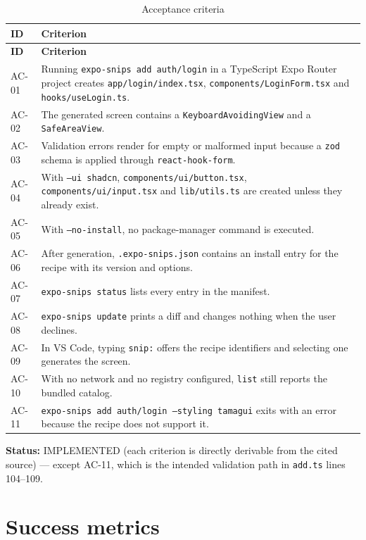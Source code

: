 \begin{longtable}{@{}L{1.3cm}L{12.6cm}@{}}
\caption{Acceptance criteria}\\
\toprule
\textbf{ID} & \textbf{Criterion} \\
\midrule
\endfirsthead
\toprule
\textbf{ID} & \textbf{Criterion} \\
\midrule
\endhead
AC-01 & Running \texttt{expo-snips add auth/login} in a TypeScript Expo Router project creates \texttt{app/login/index.tsx}, \texttt{components/LoginForm.tsx} and \texttt{hooks/useLogin.ts}. \\
AC-02 & The generated screen contains a \texttt{KeyboardAvoidingView} and a \texttt{SafeAreaView}. \\
AC-03 & Validation errors render for empty or malformed input because a \texttt{zod} schema is applied through \texttt{react-hook-form}. \\
AC-04 & With \texttt{--ui shadcn}, \texttt{components/ui/button.tsx}, \texttt{components/ui/input.tsx} and \texttt{lib/utils.ts} are created unless they already exist. \\
AC-05 & With \texttt{--no-install}, no package-manager command is executed. \\
AC-06 & After generation, \texttt{.expo-snips.json} contains an install entry for the recipe with its version and options. \\
AC-07 & \texttt{expo-snips status} lists every entry in the manifest. \\
AC-08 & \texttt{expo-snips update} prints a diff and changes nothing when the user declines. \\
AC-09 & In VS Code, typing \texttt{snip:} offers the recipe identifiers and selecting one generates the screen. \\
AC-10 & With no network and no registry configured, \texttt{list} still reports the bundled catalog. \\
AC-11 & \texttt{expo-snips add auth/login --styling tamagui} exits with an error because the recipe does not support it. \\
\bottomrule
\end{longtable}

\textbf{Status:} IMPLEMENTED (each criterion is directly derivable from the cited
source) --- except AC-11, which is the intended validation path in
\texttt{add.ts} lines 104--109.

\section{Success metrics}

